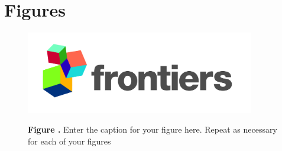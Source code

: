 \documentclass{frontiersSCNS} %
\begin{document}

\section*{Figures}


\begin{figure}[h!]
\begin{center}
\includegraphics[width=10cm]{logo1}%
\end{center}
 \textbf{\label{fig:01} Figure .}{ Enter the caption for your figure here.  Repeat as  necessary for each of your figures }
\end{figure}




\end{document}

